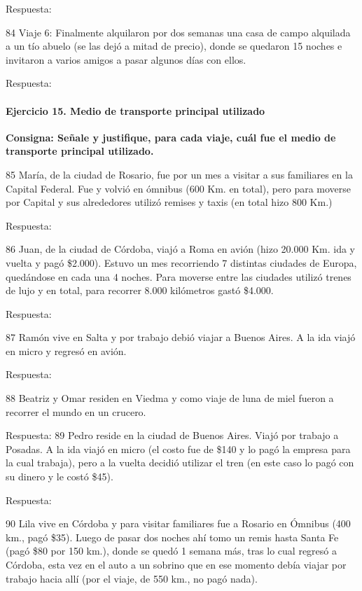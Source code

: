 \documentclass[
  openany]{book}
\begin{document}
Respuesta:

84 Viaje 6: Finalmente alquilaron por dos semanas una casa de campo alquilada a un tío abuelo (se las dejó a mitad de precio), donde se quedaron 15 noches e invitaron a varios amigos a pasar algunos días con ellos.

Respuesta:

\hypertarget{ejercicio-15.-medio-de-transporte-principal-utilizado}{%
\paragraph{Ejercicio 15. Medio de transporte principal utilizado}\label{ejercicio-15.-medio-de-transporte-principal-utilizado}}

\textbf{Consigna: Señale y justifique, para cada viaje, cuál fue el medio de transporte principal utilizado.}

85 María, de la ciudad de Rosario, fue por un mes a visitar a sus familiares en la Capital Federal. Fue y volvió en ómnibus (600 Km. en total), pero para moverse por Capital y sus alrededores utilizó remises y taxis (en total hizo 800 Km.)

Respuesta:

86 Juan, de la ciudad de Córdoba, viajó a Roma en avión (hizo 20.000 Km. ida y vuelta y pagó \$2.000). Estuvo un mes recorriendo 7 distintas ciudades de Europa, quedándose en cada una 4 noches. Para moverse entre las ciudades utilizó trenes de lujo y en total, para recorrer 8.000 kilómetros gastó \$4.000.

Respuesta:

87 Ramón vive en Salta y por trabajo debió viajar a Buenos Aires. A la ida viajó en micro y regresó en avión.

Respuesta:

88 Beatriz y Omar residen en Viedma y como viaje de luna de miel fueron a recorrer el mundo en un crucero.

Respuesta: 89 Pedro reside en la ciudad de Buenos Aires. Viajó por trabajo a Posadas. A la ida viajó en micro (el costo fue de \$140 y lo pagó la empresa para la cual trabaja), pero a la vuelta decidió utilizar el tren (en este caso lo pagó con su dinero y le costó \$45).

Respuesta:

90 Lila vive en Córdoba y para visitar familiares fue a Rosario en Ómnibus (400 km., pagó \$35). Luego de pasar dos noches ahí tomo un remis hasta Santa Fe (pagó \$80 por 150 km.), donde se quedó 1 semana más, tras lo cual regresó a Córdoba, esta vez en el auto a un sobrino que en ese momento debía viajar por trabajo hacia allí (por el viaje, de 550 km., no pagó nada).
\end{document}
